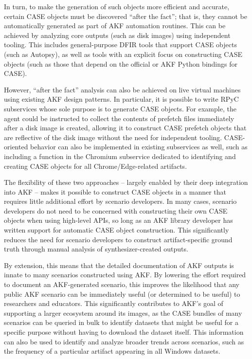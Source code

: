 In turn, to make the generation of such objects more efficient and
accurate, certain CASE objects must be discovered ``after the fact'';
that is, they cannot be automatically generated as part of AKF
automation routines. This can be achieved by analyzing core outputs
(such as disk images) using independent tooling. This includes
general-purpose DFIR tools that support CASE objects (such as Autopsy),
as well as tools with an explicit focus on constructing CASE objects
(such as those that depend on the official or AKF Python bindings for
CASE).

However, ``after the fact'' analysis can also be achieved on live
virtual machines using existing AKF design patterns. In particular, it
is possible to write RPyC subservices whose sole purpose is to generate
CASE objects. For example, the agent could be instructed to collect the
contents of prefetch files immediately after a disk image is created,
allowing it to construct CASE prefetch objects that are reflective of
the disk image without the need for independent tooling. CASE-oriented
behavior can also be implemented in existing subservices as well, such
as including a function in the Chromium subservice dedicated to
identifying and creating CASE objects for all Chrome/Edge-related
artifacts.

The flexibility of these two approaches -- largely enabled by their deep
integration into AKF -- makes it possible to construct CASE objects in a
manner that requires little additional effort by scenario developers. In
many cases, scenario developers do not need to be concerned with
constructing their own CASE objects when using high-level APIs, so long
as an AKF library developer has written support for automatic CASE
object construction. This significantly reduces the need for scenario
developers to construct artifact-specific ground truth through manual
analysis of synthesizer-created outputs.

By extension, this means that the detailed documentation of AKF outputs
is innate to many scenarios constructed using AKF. By lowering the
effort required to document an AKF-generated scenario, this improves the
likelihood that any public AKF scenario can be immediately useful (or
determined to be useful) to researchers and educators. This
significantly contributes to AKF's goal of supporting a larger ecosystem
around its images, as the CASE bundles of many scenarios can be queried
in bulk to identify datasets that might be useful for a specific purpose
without having to download the dataset itself. This information can also
be used to identify and analyze broader trends across scenarios, such as
the frequency of a particular artifact appearing in all Windows
datasets.

